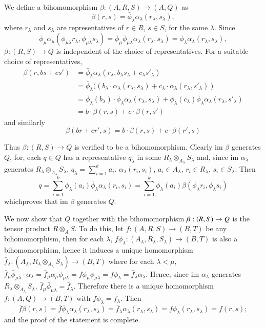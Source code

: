We define a bihomomorphism $\beta : (A, R, S) \to (A, Q)$ as
$$
\beta (r, s) = \bar{\phi}_\lambda \alpha_\lambda (r_\lambda ,
s_\lambda), 
$$
where $r_\lambda$ and $s_\lambda$ are representatives of $r \in R$,
$s \in S$, for the same $\lambda$. Since 
$$ 
\bar{\phi}_\mu \alpha_\mu (\phi_{\mu \lambda} r_\lambda,\phi_{\mu
  \lambda} s_\lambda)=\bar{\phi}_\mu \bar{\phi}_{\mu \lambda}
\alpha_\lambda (r_\lambda, s_\lambda)= \bar{\phi}_\lambda
\alpha_\lambda (r_\lambda,s_\lambda), 
$$
$\beta : (R, S) \to Q$ is independent of the choice of
representatives. For a suitable choice of representatives, 
\begin{align*}
\beta (r, bs + cs') & = \bar{\phi}_\lambda \alpha_\lambda (r_\lambda ,
b_\lambda s_\lambda + c_\lambda s'_\lambda )\\ 
 & = \bar{\phi}_\lambda ((b_\lambda \cdot \alpha_\lambda (r_\lambda,
s_\lambda ) + c_\lambda \cdot \alpha_\lambda (r_\lambda , s'_\lambda ))\\ 
 & = \bar{\phi}_\lambda (b_\lambda ) \cdot \bar{\phi}_\lambda
\alpha_\lambda (r_\lambda , s_\lambda ) + \phi_\lambda (c_\lambda )
\bar{\phi}_\lambda \alpha_\lambda (r_\lambda , s'_\lambda )\\ 
 & = b \cdot  \beta (r, s) + c \cdot \beta (r, s')
\end{align*}
and similarly
$$
\beta (br + cr' , s) = b \cdot  \beta (r, s) + c \cdot  \beta (r', s) 
$$

Thus $\beta : (R, S) \to Q$ is verified to be a
bihomomorphism. Clearly im $\beta$ generates $Q$, for, each $q \in Q$
has a representative $q_\lambda$ in some $R_\lambda
\otimes_{A_\lambda} S_\lambda$ and, since im $\alpha_\lambda$
generates $R_\lambda \otimes_{A_\lambda} S_\lambda$, $q_\lambda =
\sum^k_{i=1}a_i$. $\alpha_\lambda (r_i, s_i)$, $a_i \in
A_\lambda$, $r_i \in R_\lambda$, $s_i \in S_\lambda$. Then 
$$
q = \sum^k_{i = 1}\phi_\lambda (a_i) \bar{\phi}_\lambda \alpha_\lambda
(r_i, s_i) = \sum^k_{i = 1} \phi_\lambda (a_i) \beta (\phi_\lambda r_i,
\phi_\lambda s_i) 
$$
which\pageoriginale proves that im $\beta$ generates $Q$.

We now show that $Q$ together with the bihomomorphism $\beta: (R, S)\break
\to Q$ is the tensor product $R \otimes_A S$. To do this, let $f : (A,
R, S) \to (B, T)$ be any bihomomorphism, then for each $\lambda$, $f
\phi_\lambda : (A_\lambda , R_\lambda , S_\lambda) \to (B, T)$ is also
a bihomomorphism, hence it induces a unique homomorphism
$\bar{f}_\lambda : (A_\lambda, R_\lambda \otimes_{A_\lambda} S_\lambda
) \to (B,T)$ where for each $\lambda < \mu$, $\bar{f}_\mu
\bar{\phi}_{\mu \lambda} \cdot \alpha_\lambda = \bar{f}_\mu \alpha _\mu
\phi_{\mu \lambda} = f \phi_\mu \phi_{\mu \lambda} = f \phi_\lambda =
\bar{f}_\lambda \alpha_\lambda$. Hence, since im $\alpha_\lambda$
generates $R_\lambda \otimes_{A_\lambda} S_\lambda$, $\bar{f}_\mu
\bar{\phi}_{\mu \lambda} = \bar{f}_\lambda$. Therefore there is a
unique homomorphism $\bar{f} : (A, Q) \to (B, T)$ with $\bar{f}
\bar{\phi}_\lambda = \bar{f}_\lambda$. Then 
$$
\bar{f} \beta (r, s) = \bar{f}\bar{\phi}_\lambda \alpha_\lambda
(r_\lambda , s_\lambda) =\bar{f}_\lambda \alpha_\lambda (r_\lambda,
s_\lambda) = f \phi_\lambda (r_\lambda, s_\lambda) = f(r, s); 
$$
and the proof of the statement is complete.


